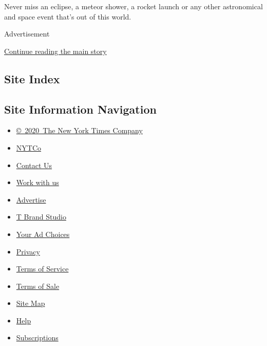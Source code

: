Never miss an eclipse, a meteor shower, a rocket launch or any other
astronomical and space event that's out of this world.

Advertisement

\protect\hyperlink{after-bottom}{Continue reading the main story}

\hypertarget{site-index}{%
\subsection{Site Index}\label{site-index}}

\hypertarget{site-information-navigation}{%
\subsection{Site Information
Navigation}\label{site-information-navigation}}

\begin{itemize}
\tightlist
\item
  \href{https://help.nytimes.com/hc/en-us/articles/115014792127-Copyright-notice}{©~2020~The
  New York Times Company}
\end{itemize}

\begin{itemize}
\tightlist
\item
  \href{https://www.nytco.com/}{NYTCo}
\item
  \href{https://help.nytimes.com/hc/en-us/articles/115015385887-Contact-Us}{Contact
  Us}
\item
  \href{https://www.nytco.com/careers/}{Work with us}
\item
  \href{https://nytmediakit.com/}{Advertise}
\item
  \href{http://www.tbrandstudio.com/}{T Brand Studio}
\item
  \href{https://www.nytimes.com/privacy/cookie-policy\#how-do-i-manage-trackers}{Your
  Ad Choices}
\item
  \href{https://www.nytimes.com/privacy}{Privacy}
\item
  \href{https://help.nytimes.com/hc/en-us/articles/115014893428-Terms-of-service}{Terms
  of Service}
\item
  \href{https://help.nytimes.com/hc/en-us/articles/115014893968-Terms-of-sale}{Terms
  of Sale}
\item
  \href{https://spiderbites.nytimes.com}{Site Map}
\item
  \href{https://help.nytimes.com/hc/en-us}{Help}
\item
  \href{https://www.nytimes.com/subscription?campaignId=37WXW}{Subscriptions}
\end{itemize}
